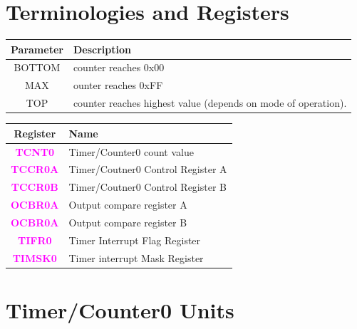 \documentclass{article}
\newcommand{\regFormat}[1]{\textbf{\textcolor{magenta}{#1}}}
\begin{document}
\section{Terminologies and Registers}
\begin{minipage}{0.45\textwidth}
    \begin{tabular}{c|p{5.5cm}}
        \textbf{Parameter} & \textbf{Description}\\
        \hline
        BOTTOM & counter reaches 0x00\\
        MAX & ounter reaches 0xFF\\
        TOP & counter reaches highest value (depends on mode of operation).        
    \end{tabular}
\end{minipage}
\begin{minipage}{0.5\textwidth}
    \begin{tabular}{c|p{6cm}}
        \textbf{Register} & \textbf{Name}\\
        \hline
        \regFormat{TCNT0} & Timer/Counter0 count value\\
        \regFormat{TCCR0A} & Timer/Coutner0 Control Register A\\
        \regFormat{TCCR0B} & Timer/Coutner0 Control Register B\\
        \regFormat{OCBR0A} & Output compare register A\\
        \regFormat{OCBR0A} & Output compare register B\\
        \regFormat{TIFR0} & Timer Interrupt Flag Register\\
        \regFormat{TIMSK0} & Timer interrupt Mask Register\\
    \end{tabular}
\end{minipage}

\section{Timer/Counter0 Units}
\end{document}
